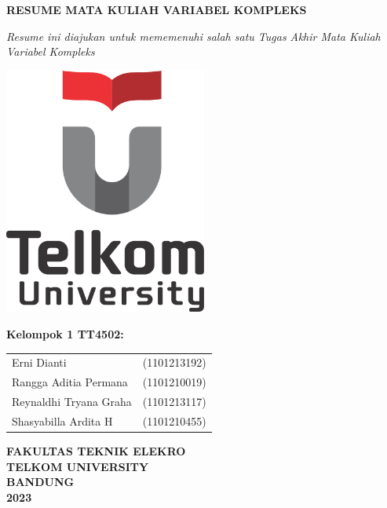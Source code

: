 \documentclass{article}
\begin{document}
\fontsize{14pt}{0}
\onehalfspacing

\begin{titlepage}
    \begin{center}
        \vspace*{1cm}

        \textbf{RESUME MATA KULIAH VARIABEL KOMPLEKS}

        \vspace{0.5cm}
        \textit{Resume ini diajukan untuk mememenuhi salah satu Tugas Akhir Mata Kuliah Variabel Kompleks}

        \vspace{1.5cm}
        \includegraphics[width=0.5\textwidth]{Telkom University Logo.png}

        \vspace{1.5cm}
        \textbf{Kelompok 1 TT4502:}\\
        \begin{table}[H]
            \begin{center}
                \begin{tabular}{ll}
                    Erni Dianti            & (1101213192) \\
                    Rangga Aditia Permana  & (1101210019)\\
                    Reynaldhi Tryana Graha & (1101213117) \\
                    Shasyabilla Ardita H   & (1101210455)
                    \end{tabular}
                \end{center}
            \end{table}
        \vfill
        \textbf{
            FAKULTAS TEKNIK ELEKRO\\
            TELKOM UNIVERSITY\\
            BANDUNG\\
            2023
        }
        \vspace*{1cm}
    \end{center}
\end{titlepage}
\end{document}
